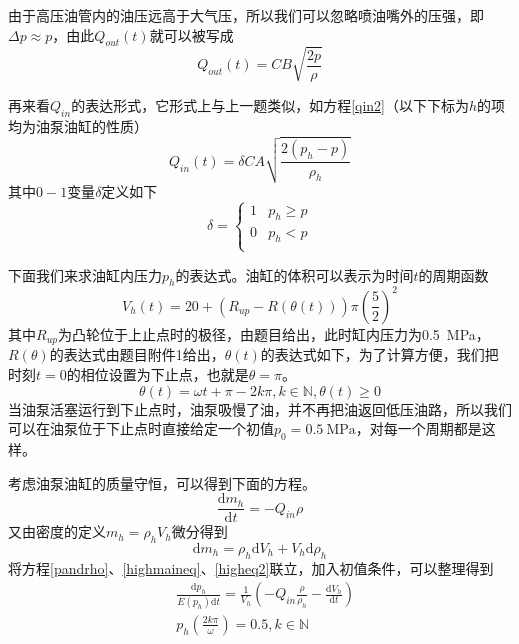 \documentclass[12pt,AutoFakeBold]{article}%
\newcommand{\dif}{\mathrm{d}}
\begin{document}
    由于高压油管内的油压远高于大气压，所以我们可以忽略喷油嘴外的压强，即$\Delta p\approx p$，由此$Q_{out}(t)$就可以被写成
    \begin{equation}
        Q_{out}(t)=CB\sqrt{\frac{2p}{\rho}}
    \end{equation}\par
    再来看$Q_{in}$的表达形式，它形式上与上一题类似，如方程\ref{qin2}（以下下标为$h$的项均为油泵油缸的性质）
    \begin{equation}
        Q_{in}(t)=\delta CA\sqrt{\frac{2(p_h-p)}{\rho_h}}
        \label{qin2}
    \end{equation}
    其中$0-1$变量$\delta$定义如下
    \begin{equation}
        \delta=
        \begin{cases}
            1&p_h\geq p\\
            0&p_h<p\\
        \end{cases}
    \end{equation}\par
    下面我们来求油缸内压力$p_h$的表达式。油缸的体积可以表示为时间$t$的周期函数
    \begin{equation}
        V_h(t)=20+(R_{up}-R(\theta(t)))\pi\left(\frac{5}{2}\right)^2
    \end{equation}
    其中$R_{up}$为凸轮位于上止点时的极径，由题目给出，此时缸内压力为\SI{0.5}{\MPa}，$R(\theta)$的表达式由题目附件1给出，$\theta(t)$的表达式如下，为了计算方便，我们把时刻$t=0$的相位设置为下止点，也就是$\theta = \pi$。
    \begin{equation}
        \theta(t)=\omega t+\pi -2k\pi,k\in\mathbb{N},\theta(t)\geq0
    \end{equation}
    当油泵活塞运行到下止点时，油泵吸慢了油，并不再把油返回低压油路，所以我们可以在油泵位于下止点时直接给定一个初值$p_0=\SI{0.5}{\MPa}$，对每一个周期都是这样。\par
    考虑油泵油缸的质量守恒，可以得到下面的方程。
    \begin{equation}
        \frac{\dif m_h}{\dif t}=-Q_{in}\rho
        \label{highmaineq}
    \end{equation}
    又由密度的定义$m_h=\rho_hV_h$微分得到
    \begin{equation}
        \dif m_h=\rho_h\dif V_h+V_h\dif\rho_h
        \label{higheq2}
    \end{equation}
    将方程\ref{pandrho}、\ref{highmaineq}、\ref{higheq2}联立，加入初值条件，可以整理得到
    \begin{equation}
        \begin{aligned}
            &\frac{\dif p_h}{E(p_h)\dif t}=\frac{1}{V_h}\left(-Q_{in}\frac{\rho}{\rho_h}-\frac{\dif V_h}{\dif t}\right)\\
            &p_h(\frac{2k\pi}{\omega})=0.5,k\in\mathbb{N}
        \end{aligned}
        \label{highmaineq2}
    \end{equation}\par
\end{document}
